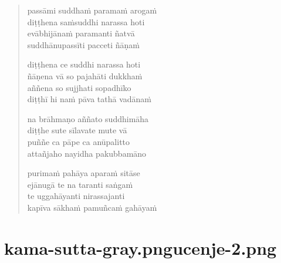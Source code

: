 

\cleartoverso

\vspace*{30mm}

\begin{verse}

passāmi suddhaṁ paramaṁ arogaṁ\\
diṭṭhena saṁsuddhi narassa hoti\\
evābhijānaṁ paramanti ñatvā\\
suddhānupassīti pacceti ñāṇaṁ

diṭṭhena ce suddhi narassa hoti\\
ñāṇena vā so pajahāti dukkhaṁ\\
aññena so sujjhati sopadhīko\\
diṭṭhī hi naṁ pāva tathā vadānaṁ

na brāhmaṇo aññato suddhimāha\\
diṭṭhe sute sīlavate mute vā\\
puññe ca pāpe ca anūpalitto\\
attañjaho nayidha pakubbamāno

purimaṁ pahāya aparaṁ sitāse\\
ejānugā te na taranti saṅgaṁ\\
te uggahāyanti nirassajanti\\
kapīva sākhaṁ pamuñcaṁ gahāyaṁ

\end{verse}


\chapter[Suddhaṭṭhaka Sutta]{{kama-sutta-gray.png}{ucenje-2.png}}


